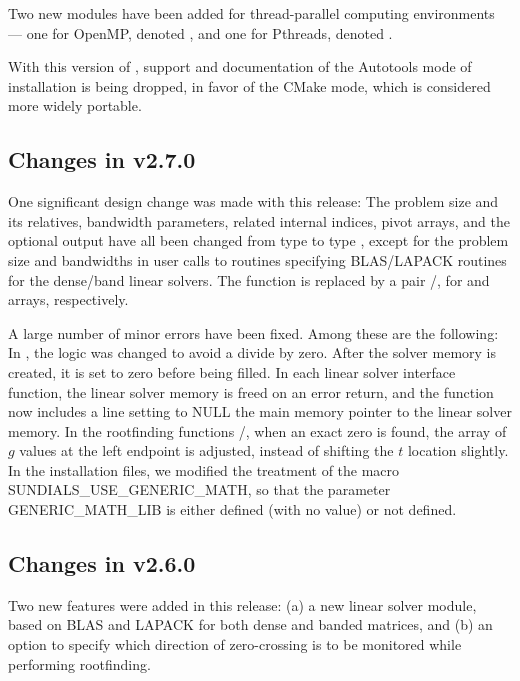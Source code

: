 Two new {\nvector} modules have been added for thread-parallel computing
environments --- one for OpenMP, denoted ,
and one for Pthreads, denoted .

With this version of {\sundials}, support and documentation of the
Autotools mode of installation is being dropped, in favor of the
CMake mode, which is considered more widely portable.

\subsection*{Changes in v2.7.0}

One significant design change was made with this release: The problem
size and its relatives, bandwidth parameters, related internal indices,
pivot arrays, and the optional output  have all been
changed from type  to type , except for the
problem size and bandwidths in user calls to routines specifying
BLAS/LAPACK routines for the dense/band linear solvers.  The function
 is replaced by a pair /,
for  and  arrays, respectively.

A large number of minor errors have been fixed.  Among these are the following:
In , the logic was changed to avoid a divide by zero.
After the solver memory is created, it is set to zero before being filled.
In each linear solver interface function, the linear solver memory is
freed on an error return, and the  function now includes a
line setting to NULL the main memory pointer to the linear solver memory.
In the rootfinding functions /, when an exact
zero is found, the array  of $g$ values at the left endpoint is
adjusted, instead of shifting the $t$ location  slightly.
In the installation files, we modified the treatment of the macro
SUNDIALS\_USE\_GENERIC\_MATH, so that the parameter GENERIC\_MATH\_LIB is
either defined (with no value) or not defined.

\subsection*{Changes in v2.6.0}

Two new features were added in this release: (a) a new linear solver module,
based on BLAS and LAPACK for both dense and banded matrices, and (b) an option
to specify which direction of zero-crossing is to be monitored while performing
rootfinding.

